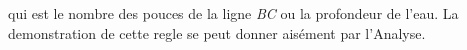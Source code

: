                      qui est le nombre des pouces de la ligne \textit{BC} ou la profondeur de l'eau. La  demonstration de cette regle se peut donner ais\'{e}ment  par l'Analyse.\pend 